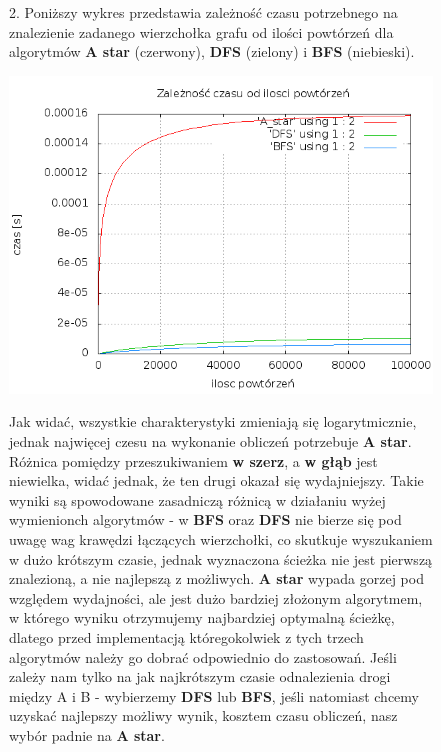 \documentclass[a4paper,11pt]{report}
\begin{document}
\begin{figure}
  2. Poniższy wykres przedstawia zależność czasu potrzebnego na znalezienie zadanego wierzchołka grafu od ilości powtórzeń dla algorytmów \textbf{A star} (czerwony), \textbf{DFS} (zielony) i \textbf{BFS} (niebieski).
  \\\begin{center} \includegraphics[scale=0.55]{./Razem.png}\end{center}
  Jak widać, wszystkie charakterystyki zmieniają się logarytmicznie, jednak najwięcej czesu na wykonanie obliczeń potrzebuje \textbf{A star}. Różnica pomiędzy przeszukiwaniem \textbf{w szerz}, a \textbf{w głąb} jest niewielka, widać jednak, że ten drugi okazał się wydajniejszy. Takie wyniki są spowodowane zasadniczą różnicą w działaniu wyżej wymienionch algorytmów - w \textbf{BFS} oraz \textbf{DFS} nie bierze się pod uwagę wag krawędzi łączących wierzchołki, co skutkuje wyszukaniem w dużo krótszym czasie, jednak wyznaczona ścieżka nie jest pierwszą znalezioną, a nie najlepszą z możliwych. \textbf{A star} wypada gorzej pod względem wydajności, ale jest dużo bardziej złożonym algorytmem, w którego wyniku otrzymujemy najbardziej optymalną ścieżkę, dlatego przed implementacją któregokolwiek z tych trzech algorytmów należy go dobrać odpowiednio do zastosowań. Jeśli zależy nam tylko na jak najkrótszym czasie odnalezienia drogi między A i B - wybierzemy \textbf{DFS} lub \textbf{BFS}, jeśli natomiast chcemy uzyskać najlepszy możliwy wynik, kosztem czasu obliczeń, nasz wybór padnie na \textbf{A star}.
\end{figure}
\end{document}
